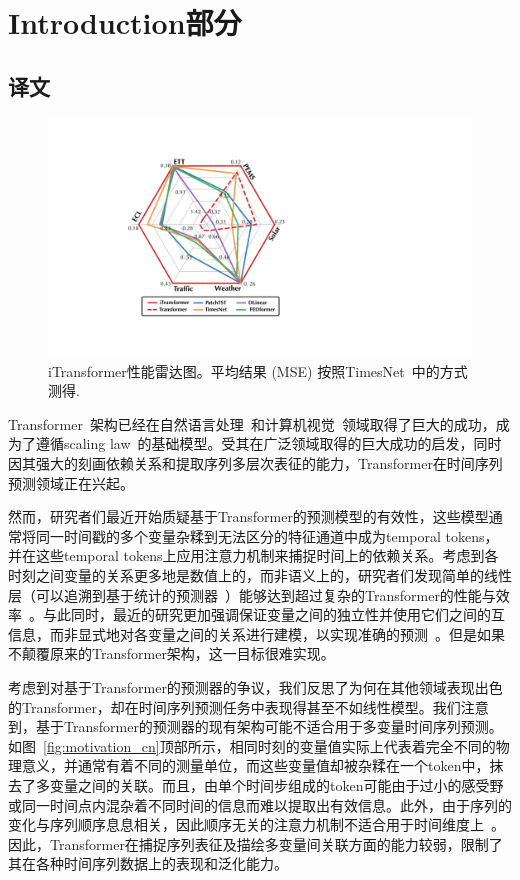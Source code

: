 \documentclass[twoside,12pt]{article}
\begin{document}
\section{Introduction部分}
\subsection{译文}
\begin{figure}[t]
  \begin{center}
    \includegraphics[width=0.5\columnwidth]{pic/radar.pdf}
    \vspace{-10pt}
    \caption{\small{iTransformer性能雷达图。平均结果 (MSE) 按照TimesNet~\citeyearpar{Timesnet}中的方式测得}.}
    \label{fig:radar_cn}
  \end{center}
  \vspace{-14pt}
\end{figure}

Transformer~\citep{Transformer}架构已经在自然语言处理~\citep{brown2020language}和计算机视觉~\citep{dosovitskiy2020image}领域取得了巨大的成功，成为了遵循scaling law~\citep{kaplan2020scaling}的基础模型。受其在广泛领域取得的巨大成功的启发，同时因其强大的刻画依赖关系和提取序列多层次表征的能力，Transformer在时间序列预测领域正在兴起。~\citep{Informer, Autoformer, PatchTST}

然而，研究者们最近开始质疑基于Transformer的预测模型的有效性，这些模型通常将同一时间戳的多个变量杂糅到无法区分的特征通道中成为temporal tokens，并在这些temporal tokens上应用注意力机制来捕捉时间上的依赖关系。考虑到各时刻之间变量的关系更多地是数值上的，而非语义上的，研究者们发现简单的线性层（可以追溯到基于统计的预测器~\citep{box1968some}）能够达到超过复杂的Transformer的性能与效率~\citep{DLinear, das2023long}。与此同时，最近的研究更加强调保证变量之间的独立性并使用它们之间的互信息，而非显式地对各变量之间的关系进行建模，以实现准确的预测~\citep{DLinear, das2023long}。但是如果不颠覆原来的Transformer架构，这一目标很难实现。

考虑到对基于Transformer的预测器的争议，我们反思了为何在其他领域表现出色的Transformer，却在时间序列预测任务中表现得甚至不如线性模型。我们注意到，基于Transformer的预测器的现有架构可能不适合用于多变量时间序列预测。如图~\ref{fig:motivation_cn}顶部所示，相同时刻的变量值实际上代表着完全不同的物理意义，并通常有着不同的测量单位，而这些变量值却被杂糅在一个token中，抹去了多变量之间的关联。而且，由单个时间步组成的token可能由于过小的感受野或同一时间点内混杂着不同时间的信息而难以提取出有效信息。此外，由于序列的变化与序列顺序息息相关，因此顺序无关的注意力机制不适合用于时间维度上~\citep{DLinear}。因此，Transformer在捕捉序列表征及描绘多变量间关联方面的能力较弱，限制了其在各种时间序列数据上的表现和泛化能力。
\end{document}
